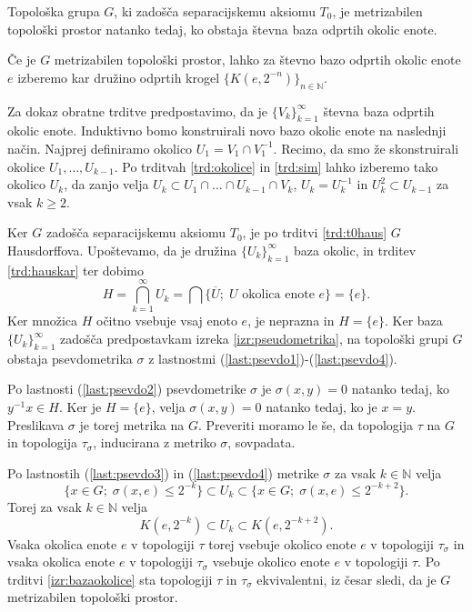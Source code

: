 \documentclass[mat1]{fmfdelo}
\newcommand{\N}{\mathbb N}
\newcommand{\closure}[1]{\overline{#1}}
\begin{document}
\begin{izrek}\label{izr:metrizabilnost}
	Topološka grupa $G$, ki zadošča separacijskemu aksiomu $T_0$, je me\-tri\-za\-bi\-len topološki prostor natanko tedaj, ko obstaja števna baza odprtih okolic enote.
\end{izrek}

\begin{dokaz}
Če je $G$ metrizabilen topološki prostor, lahko za števno bazo odprtih okolic enote $e$ izberemo kar družino odprtih krogel $\lbrace K(e, 2^{-n}) \rbrace_{n \in \N}$.

Za dokaz obratne trditve predpostavimo, da je $\lbrace V_k \rbrace_{k = 1}^\infty$ števna baza odprtih okolic enote. Induktivno bomo konstruirali novo bazo okolic enote na naslednji način. Najprej definiramo okolico $U_1 = V_1 \cap V_1^{-1}$. Recimo, da smo že skonstruirali okolice $U_1,\dots,U_{k-1}$. 
Po trditvah \ref{trd:okolice} in \ref{trd:sim} lahko
izberemo tako okolico $U_k$, da zanjo velja $U_k \subset U_1 \cap \dots \cap U_{k-1}\cap V_k$, $U_k = U_k^{-1}$ in $U_k^2 \subset U_{k-1}$ za vsak $k \geq 2$.

Ker $G$ zadošča separacijskemu aksiomu $T_0$, je po trditvi \ref{trd:t0haus} $G$ Hausdorffova. Upoštevamo, da je družina $\lbrace U_k \rbrace_{k=1}^\infty$ baza okolic, in trditev \ref{trd:hauskar} ter dobimo
\[ H = \bigcap_{k=1}^\infty U_k = \bigcap\lbrace \closure{U} ;\; U \text{ okolica enote } e \rbrace = \lbrace e \rbrace. \]
Ker množica $H$ očitno vsebuje vsaj enoto $e$, je neprazna in $H = \lbrace e \rbrace$.
Ker baza $\lbrace U_k \rbrace_{k = 1}^\infty$ zadošča predpostavkam izreka \ref{izr:pseudometrika}, na topološki grupi $G$ obstaja psevdometrika $\sigma$ z lastnostmi (\ref{last:psevdo1})-(\ref{last:psevdo4}).

Po lastnosti (\ref{last:psevdo2}) psevdometrike $\sigma$ je $\sigma(x, y) = 0$ natanko tedaj, ko $y^{-1}x \in H$. Ker je $H = \lbrace e \rbrace$, velja $\sigma(x, y) = 0$ natanko tedaj, ko je $x = y$. Preslikava $\sigma$ je torej metrika na $G$. Preveriti moramo le še, da topologija $\tau$ na $G$ in topologija $\tau_\sigma$, inducirana z metriko $\sigma$, sovpadata.

Po lastnostih (\ref{last:psevdo3}) in (\ref{last:psevdo4}) metrike $\sigma$ za vsak $k \in \N$ velja
\[ \lbrace x \in G ;\; \sigma(x, e) \leq 2^{-k} \rbrace \subset U_k \subset \lbrace x \in G ;\; \sigma(x, e) \leq 2^{-k+2} \rbrace.\]
Torej za vsak $k \in \N$ velja
\[ K(e, 2^{-k}) \subset U_k \subset K(e, 2^{-k+2}). \]
Vsaka okolica enote $e$ v topologiji $\tau$ torej vsebuje okolico enote $e$ v topologiji $\tau_\sigma$ in vsaka okolica enote $e$ v topologiji $\tau_\sigma$ vsebuje okolico enote $e$ v topologiji $\tau$.
Po trditvi \ref{izr:bazaokolice} sta topologiji $\tau$ in $\tau_\sigma$  ekvivalentni, iz česar sledi, da je $G$ metrizabilen topološki prostor.
\end{dokaz}
\end{document}
